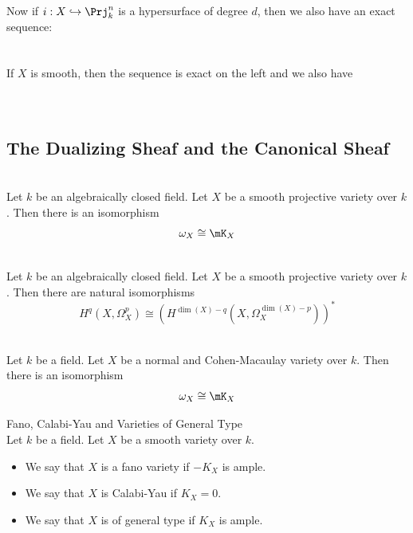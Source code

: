 \documentclass[a4paper]{article}
\begin{document}
Now if $i:X\hookrightarrow\Prj_k^n$ is a hypersurface of degree $d$, then we also have an exact sequence: \\
\\~\\
If $X$ is smooth, then the sequence is exact on the left and we also have \\
\\~\\

\subsection{The Dualizing Sheaf and the Canonical Sheaf}
\begin{prp}{}{}\\
Let $k$ be an algebraically closed field. Let $X$ be a smooth projective variety over $k$. Then there is an isomorphism $$\omega_X\cong\mK_X$$
\end{prp}

\begin{crl}{}{}\\
Let $k$ be an algebraically closed field. Let $X$ be a smooth projective variety over $k$. Then there are natural isomorphisms $$H^q(X,\Omega_X^p)\cong(H^{\dim(X)-q}(X,\Omega_X^{\dim(X)-p}))^\ast$$
\end{crl}

\begin{prp}{}{}\\
Let $k$ be a field. Let $X$ be a normal and Cohen-Macaulay variety over $k$. Then there is an isomorphism $$\omega_X\cong\mK_X$$
\end{prp}

\begin{defn}{Fano, Calabi-Yau and Varieties of General Type}{}\\
Let $k$ be a field. Let $X$ be a smooth variety over $k$. 
\begin{itemize}
\item We say that $X$ is a fano variety if $-K_X$ is ample. 
\item We say that $X$ is Calabi-Yau if $K_X=0$. 
\item We say that $X$ is of general type if $K_X$ is ample. 
\end{itemize}
\end{defn}
\end{document}
